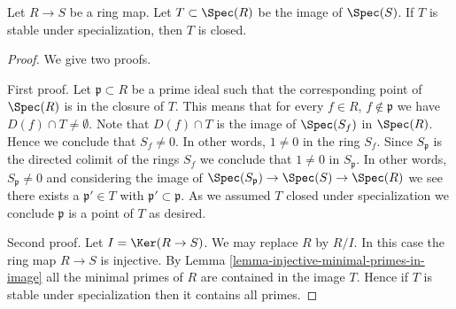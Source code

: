\begin{lemma}
\label{lemma-image-stable-specialization-closed}
Let $R \to S$ be a ring map. Let $T \subset \Spec(R)$
be the image of $\Spec(S)$. If $T$ is stable under specialization,
then $T$ is closed.
\end{lemma}

\begin{proof}
We give two proofs.

\medskip\noindent
First proof. Let $\mathfrak p \subset R$ be a prime ideal such that
the corresponding point of $\Spec(R)$ is in the closure
of $T$. This means that for every $f \in R$, $f \not \in \mathfrak p$
we have $D(f) \cap T \not = \emptyset$. Note that $D(f) \cap T$
is the image of $\Spec(S_f)$ in $\Spec(R)$. Hence
we conclude that $S_f \not = 0$. In other words, $1 \not = 0$ in
the ring $S_f$. Since $S_{\mathfrak p}$ is the directed colimit
of the rings $S_f$ we conclude that $1 \not = 0$ in
$S_{\mathfrak p}$. In other words, $S_{\mathfrak p} \not = 0$ and
considering the image of $\Spec(S_{\mathfrak p})
\to \Spec(S) \to \Spec(R)$ we see there exists
a $\mathfrak p' \in T$ with $\mathfrak p' \subset \mathfrak p$.
As we assumed $T$ closed under specialization we conclude $\mathfrak p$
is a point of $T$ as desired.

\medskip\noindent
Second proof. Let $I = \Ker(R \to S)$. We may replace $R$ by $R/I$.
In this case the ring map $R \to S$ is injective.
By Lemma \ref{lemma-injective-minimal-primes-in-image}
all the minimal primes of $R$ are contained in the image $T$. Hence
if $T$ is stable under specialization then it contains all primes.
\end{proof}